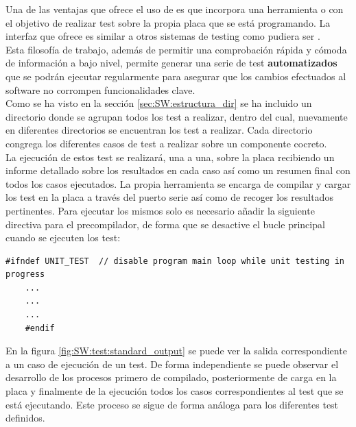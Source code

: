     Una de las ventajas que ofrece el uso de  es que incorpora una herramienta o   con el objetivo de realizar test sobre la propia placa que se está programando. La interfaz que ofrece es similar a otros sistemas de testing como pudiera ser .
    \\
    
    Esta filosofía de trabajo, además de permitir una comprobación rápida y cómoda de información a bajo nivel, permite generar una serie de test \textbf{automatizados} que se podrán ejecutar regularmente para asegurar que los cambios efectuados al software no corrompen funcionalidades clave.
    \\
    
    Como se ha visto en la sección \ref{sec:SW:estructura_dir} se ha incluido un directorio donde se agrupan todos los test a realizar, dentro del cual, nuevamente en diferentes directorios se encuentran los test a realizar. Cada directorio congrega los diferentes casos de test a realizar sobre un componente cocreto.
    \\
    
    La ejecución de estos test se realizará, una a una, sobre la placa recibiendo un informe detallado sobre los resultados en cada caso así como un resumen final con todos los casos ejecutados. La propia herramienta se encarga de compilar y cargar los test en la placa a través del puerto serie así como de recoger los resultados pertinentes. Para ejecutar los mismos solo es necesario añadir la siguiente directiva para el precompilador, de forma que se desactive el bucle principal cuando se ejecuten los test:

    \begin{lstlisting}[frame=single]
    #ifndef UNIT_TEST  // disable program main loop while unit testing in progress
    ...
    ...
    ...
    #endif
    \end{lstlisting}

    En la figura \ref{fig:SW:test:standard_output} se puede ver la salida correspondiente a un caso de ejecución de un test. De forma independiente se puede observar el desarrollo de los procesos primero de compilado, posteriormente de carga en la placa y finalmente de la ejecución todos los casos correspondientes al test que se está ejecutando. Este proceso se sigue de forma análoga para los diferentes test definidos.

